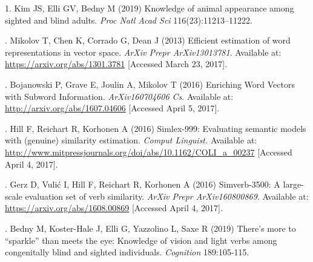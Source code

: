\documentclass[12pt]{article}
\begin{document}
1. 	Kim JS, Elli GV, Bedny M (2019) Knowledge of animal appearance among sighted and blind adults. {\it Proc Natl Acad Sci} 116(23):11213–11222.
\vspace{3mm}

. 	Mikolov T, Chen K, Corrado G, Dean J (2013) Efficient estimation of word representations in vector space. {\it ArXiv Prepr ArXiv13013781}. Available at: \url{https://arxiv.org/abs/1301.3781} [Accessed March 23, 2017].
\vspace{3mm}

. 	Bojanowski P, Grave E, Joulin A, Mikolov T (2016) Enriching Word Vectors with Subword Information. {\it ArXiv160704606 Cs}. Available at: \url{http://arxiv.org/abs/1607.04606} [Accessed April 5, 2017].
\vspace{3mm}

. 	Hill F, Reichart R, Korhonen A (2016) Simlex-999: Evaluating semantic models with (genuine) similarity estimation.  {\it Comput Linguist.} Available at: \url{http://www.mitpressjournals.org/doi/abs/10.1162/COLI_a_00237} [Accessed April 4, 2017].
\vspace{3mm}

. 	Gerz D, Vulić I, Hill F, Reichart R, Korhonen A (2016) Simverb-3500: A large-scale evaluation set of verb similarity.  {\it ArXiv Prepr ArXiv160800869}. Available at: \url{https://arxiv.org/abs/1608.00869} [Accessed April 4, 2017].
\vspace{3mm}

. 	Bedny M, Koster-Hale J, Elli G, Yazzolino L, Saxe R (2019) There's more to ``sparkle'' than meets the eye: Knowledge of vision and light verbs among congenitally blind and sighted individuals.  {\it Cognition} 189:105-115.
\end{document}
